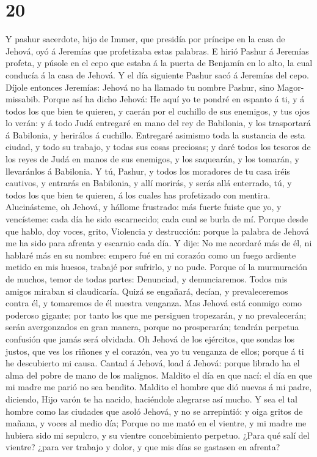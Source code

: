 \hypertarget{section-19}{%
\section{20}\label{section-19}}

 Y pashur sacerdote, hijo de Immer, que presidía por
príncipe en la casa de Jehová, oyó á Jeremías que profetizaba estas
palabras.  E hirió Pashur á Jeremías profeta, y púsole en el
cepo que estaba á la puerta de Benjamín en lo alto, la cual conducía á
la casa de Jehová.  Y el día siguiente Pashur sacó á
Jeremías del cepo. Díjole entonces Jeremías: Jehová no ha llamado tu
nombre Pashur, sino Magor-missabib.  Porque así ha dicho
Jehová: He aquí yo te pondré en espanto á ti, y á todos los que bien te
quieren, y caerán por el cuchillo de sus enemigos, y tus ojos lo verán:
y á todo Judá entregaré en mano del rey de Babilonia, y los trasportará
á Babilonia, y herirálos á cuchillo.  Entregaré asimismo
toda la sustancia de esta ciudad, y todo su trabajo, y todas sus cosas
preciosas; y daré todos los tesoros de los reyes de Judá en manos de sus
enemigos, y los saquearán, y los tomarán, y llevaránlos á Babilonia.
 Y tú, Pashur, y todos los moradores de tu casa iréis
cautivos, y entrarás en Babilonia, y allí morirás, y serás allá
enterrado, tú, y todos los que bien te quieren, á los cuales has
profetizado con mentira.  Alucinásteme, oh Jehová, y hállome
frustrado: más fuerte fuiste que yo, y vencísteme: cada día he sido
escarnecido; cada cual se burla de mí.  Porque desde que
hablo, doy voces, grito, Violencia y destrucción: porque la palabra de
Jehová me ha sido para afrenta y escarnio cada día.  Y dije:
No me acordaré más de él, ni hablaré más en su nombre: empero fué en mi
corazón como un fuego ardiente metido en mis huesos, trabajé por
sufrirlo, y no pude.  Porque oí la murmuración de muchos,
temor de todas partes: Denunciad, y denunciaremos. Todos mis amigos
miraban si claudicaría. Quizá se engañará, decían, y prevaleceremos
contra él, y tomaremos de él nuestra venganza.  Mas Jehová
está conmigo como poderoso gigante; por tanto los que me persiguen
tropezarán, y no prevalecerán; serán avergonzados en gran manera, porque
no prosperarán; tendrán perpetua confusión que jamás será olvidada.
 Oh Jehová de los ejércitos, que sondas los justos, que ves
los riñones y el corazón, vea yo tu venganza de ellos; porque á ti he
descubierto mi causa.  Cantad á Jehová, load á Jehová:
porque librado ha el alma del pobre de mano de los malignos.
 Maldito el día en que nací: el día en que mi madre me
parió no sea bendito.  Maldito el hombre que dió nuevas á
mi padre, diciendo, Hijo varón te ha nacido, haciéndole alegrarse así
mucho.  Y sea el tal hombre como las ciudades que asoló
Jehová, y no se arrepintió: y oiga gritos de mañana, y voces al medio
día;  Porque no me mató en el vientre, y mi madre me
hubiera sido mi sepulcro, y su vientre concebimiento perpetuo.
 ¿Para qué salí del vientre? ¿para ver trabajo y dolor, y
que mis días se gastasen en afrenta?

